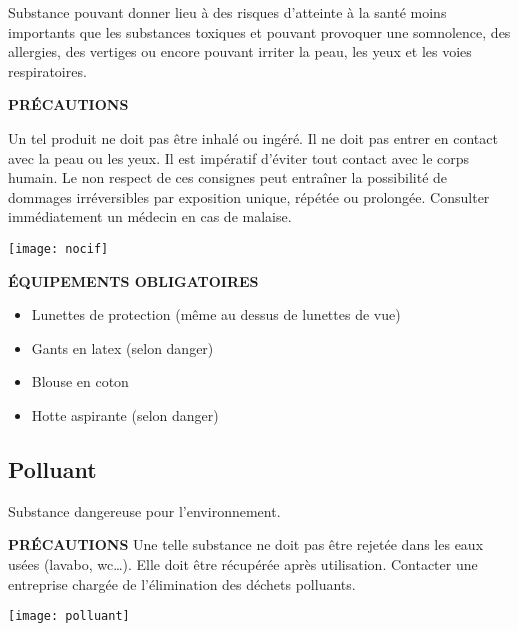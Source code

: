 \documentclass[a4paper, 11pt, final, garamond]{book}
\begin{document}
\begin{minipage}{0.77\linewidth}
    Substance pouvant donner lieu à des risques d'atteinte à la santé moins
    importants que les substances toxiques et pouvant provoquer une somnolence,
    des allergies, des vertiges ou encore pouvant irriter la peau, les yeux et
    les voies respiratoires.\bigbreak

    \textbf{PRÉCAUTIONS}

    Un tel produit ne doit pas être inhalé ou ingéré. Il ne doit pas entrer en
    contact avec la peau ou les yeux. Il est impératif d'éviter tout contact
    avec le corps humain. Le non respect de ces consignes peut entraîner la
    possibilité de dommages irréversibles par exposition unique, répétée ou
    prolongée. Consulter immédiatement un médecin en cas de malaise.
\end{minipage}
\begin{minipage}{0.23\linewidth}
    \begin{center}
        \texttt{[image: nocif]}
    \end{center}
\end{minipage}

\medskip

\textbf{ÉQUIPEMENTS OBLIGATOIRES}
\begin{itemize}
    \item Lunettes de protection (même au dessus de lunettes de vue)
    \item Gants en latex (selon danger)
    \item Blouse en coton
    \item Hotte aspirante (selon danger)
\end{itemize}

\subsection{Polluant}

\begin{minipage}{0.77\linewidth}
    Substance dangereuse pour l'environnement.\bigbreak

    \textbf{PRÉCAUTIONS}
    Une telle substance ne doit pas être rejetée dans les eaux usées (lavabo,
    wc…). Elle doit être récupérée après utilisation. Contacter une entreprise
    chargée de l'élimination des déchets polluants.
\end{minipage}
\begin{minipage}{0.23\linewidth}
    \begin{center}
        \texttt{[image: polluant]}
    \end{center}
\end{minipage}


\end{document}
